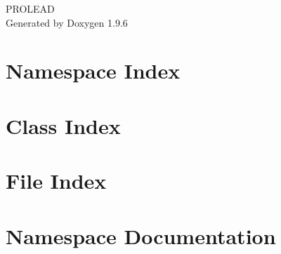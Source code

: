 \documentclass[twoside]{book}
\newcommand{\+}{\discretionary{\mbox{\scriptsize$\hookleftarrow$}}{}{}}
\newcommand{\clearemptydoublepage}{%
    \newpage{\pagestyle{empty}\cleardoublepage}%
  }
\begin{document}
  \raggedbottom
    \hypersetup{pageanchor=false,
                bookmarksnumbered=true,
                pdfencoding=unicode
               }
  \begin{titlepage}
  \vspace*{7cm}
  \begin{center}%
  {\Large PROLEAD}\\
  \vspace*{1cm}
  {\large Generated by Doxygen 1.9.6}\\
  \end{center}
  \end{titlepage}
  \clearemptydoublepage
  \tableofcontents
  \clearemptydoublepage
  \hypersetup{pageanchor=true}
\chapter{Namespace Index}

\chapter{Class Index}

\chapter{File Index}

\chapter{Namespace Documentation}























\end{document}
